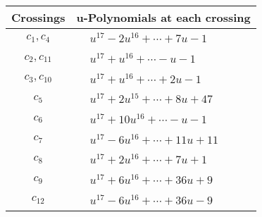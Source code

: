 \documentclass[1p]{elsarticle_modified}
\theoremstyle{definition}
\begin{document}
\begin{tabular}{m{50pt}|m{274pt}}
Crossings & \hspace{64pt}u-Polynomials at each crossing \\
\hline $$\begin{aligned}c_{1},c_{4}\end{aligned}$$&$\begin{aligned}
&u^{17}-2 u^{16}+\cdots+7 u-1
\end{aligned}$\\
\hline $$\begin{aligned}c_{2},c_{11}\end{aligned}$$&$\begin{aligned}
&u^{17}+u^{16}+\cdots- u-1
\end{aligned}$\\
\hline $$\begin{aligned}c_{3},c_{10}\end{aligned}$$&$\begin{aligned}
&u^{17}+u^{16}+\cdots+2 u-1
\end{aligned}$\\
\hline $$\begin{aligned}c_{5}\end{aligned}$$&$\begin{aligned}
&u^{17}+2 u^{15}+\cdots+8 u+47
\end{aligned}$\\
\hline $$\begin{aligned}c_{6}\end{aligned}$$&$\begin{aligned}
&u^{17}+10 u^{16}+\cdots- u-1
\end{aligned}$\\
\hline $$\begin{aligned}c_{7}\end{aligned}$$&$\begin{aligned}
&u^{17}-6 u^{16}+\cdots+11 u+11
\end{aligned}$\\
\hline $$\begin{aligned}c_{8}\end{aligned}$$&$\begin{aligned}
&u^{17}+2 u^{16}+\cdots+7 u+1
\end{aligned}$\\
\hline $$\begin{aligned}c_{9}\end{aligned}$$&$\begin{aligned}
&u^{17}+6 u^{16}+\cdots+36 u+9
\end{aligned}$\\
\hline $$\begin{aligned}c_{12}\end{aligned}$$&$\begin{aligned}
&u^{17}-6 u^{16}+\cdots+36 u-9
\end{aligned}$\\
\hline
\end{tabular}\\~\\
\end{document}
